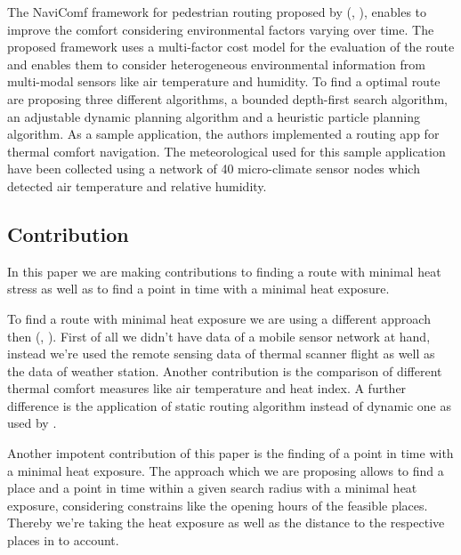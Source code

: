 The NaviComf framework for pedestrian routing proposed by \citeauthor{Dang2012} (\citeyear{Dang2012}, \citeyear{Dang2013}), enables to improve the comfort considering environmental factors varying over time. The proposed framework uses a multi-factor cost model for the evaluation of the route and enables them to consider heterogeneous environmental information from multi-modal
 sensors like air temperature and humidity. To find a optimal route \textcite{Dang2013} are proposing three different algorithms,  a bounded depth-first search algorithm, an adjustable dynamic planning algorithm and a heuristic particle planning algorithm. As a sample application, the authors implemented a routing app for thermal comfort navigation. The meteorological used for this sample application have been collected using a network of 40 micro-climate sensor nodes which detected air temperature and relative humidity. 

\subsection{Contribution}

In this paper we are making contributions to finding a route with minimal heat stress as well as to find a point in time with a minimal heat exposure. 

To find a route with minimal heat exposure we are using a different approach then \citeauthor{Dang2012} (\citeyear{Dang2012}, \citeyear{Dang2013}). First of all we didn't have data of a mobile sensor network at hand, instead we're used the remote sensing data of thermal scanner flight as well as the data of weather station. Another contribution is the comparison of different thermal comfort measures like air temperature and heat index. A further difference is the application of static routing algorithm instead of dynamic one as used by \citeauthor{Dang2012}.

Another impotent contribution of this paper is the finding of a point in time with a minimal heat exposure. The approach which we are proposing allows to find a place and a point in time within a given search radius with a minimal heat exposure, considering constrains like the opening hours of the feasible places. Thereby we're taking the heat exposure as well as the distance to the respective places in to account.   



